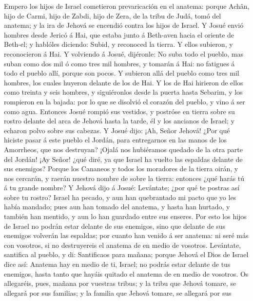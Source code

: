  Empero los hijos de Israel cometieron prevaricación en el
anatema: porque Achân, hijo de Carmi, hijo de Zabdi, hijo de Zera, de la
tribu de Judá, tomó del anatema; y la ira de Jehová se encendió contra
los hijos de Israel.  Y Josué envió hombres desde Jericó á
Hai, que estaba junto á Beth-aven hacia el oriente de Beth-el; y
hablóles diciendo: Subid, y reconoced la tierra. Y ellos subieron, y
reconocieron á Hai.  Y volviendo á Josué, dijéronle: No
suba todo el pueblo, mas suban como dos mil ó como tres mil hombres, y
tomarán á Hai: no fatigues á todo el pueblo allí, porque son pocos.
 Y subieron allá del pueblo como tres mil hombres, los
cuales huyeron delante de los de Hai.  Y los de Hai
hirieron de ellos como treinta y seis hombres, y siguiéronlos desde la
puerta hasta Sebarim, y los rompieron en la bajada: por lo que se
disolvió el corazón del pueblo, y vino á ser como agua. 
Entonces Josué rompió sus vestidos, y postróse en tierra sobre su rostro
delante del arca de Jehová hasta la tarde, él y los ancianos de Israel;
y echaron polvo sobre sus cabezas.  Y Josué dijo: ¡Ah,
Señor Jehová! ¿Por qué hiciste pasar á este pueblo el Jordán, para
entregarnos en las manos de los Amorrheos, que nos destruyan? ¡Ojalá nos
hubiéramos quedado de la otra parte del Jordán!  ¡Ay
Señor! ¿qué diré, ya que Israel ha vuelto las espaldas delante de sus
enemigos?  Porque los Cananeos y todos los moradores de la
tierra oirán, y nos cercarán, y raerán nuestro nombre de sobre la
tierra: entonces ¿qué harás tú á tu grande nombre?  Y
Jehová dijo á Josué: Levántate; ¿por qué te postras así sobre tu rostro?
 Israel ha pecado, y aun han quebrantado mi pacto que yo
les había mandado; pues aun han tomado del anatema, y hasta han hurtado,
y también han mentido, y aun lo han guardado entre sus enseres.
 Por esto los hijos de Israel no podrán estar delante de
sus enemigos, sino que delante de sus enemigos volverán las espaldas;
por cuanto han venido á ser anatema: ni seré más con vosotros, si no
destruyereis el anatema de en medio de vosotros. 
Levántate, santifica al pueblo, y di: Santificaos para mañana; porque
Jehová el Dios de Israel dice así: Anatema hay en medio de ti, Israel;
no podrás estar delante de tus enemigos, hasta tanto que hayáis quitado
el anatema de en medio de vosotros.  Os allegaréis, pues,
mañana por vuestras tribus; y la tribu que Jehová tomare, se allegará
por sus familias; y la familia que Jehová tomare, se allegará por sus
